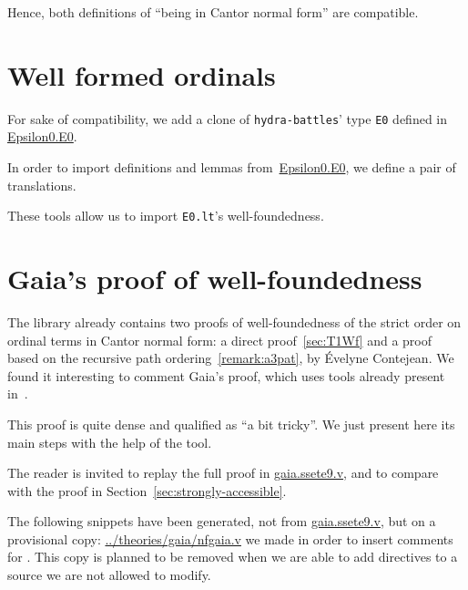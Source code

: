 

Hence, both definitions of ``being in Cantor normal form'' are
compatible.


\section{Well formed ordinals}
For sake of compatibility, we add a clone of \texttt{hydra-battles}' type \texttt{E0} defined in \href{../theories/html/hydras.Epsilon0.E0.html}{Epsilon0.E0}.


In order to import definitions and lemmas
from~\href{../theories/html/hydras.Epsilon0.E0.html}{Epsilon0.E0}, we define a pair of translations.


These tools allow us to import \texttt{E0.lt}'s  well-foundedness.


\section{Gaia's proof of well-foundedness}
The library \Hydras already contains two proofs
of well-foundedness of the strict order on ordinal terms in
Cantor normal form: a direct proof~\vref{sec:T1Wf} and a proof based on the recursive path ordering~\vref{remark:a3pat}, by
\'Evelyne Contejean. We found it interesting to comment Gaia's proof, which uses tools already present in~\cite{CantorContrib}.



This proof is quite dense and qualified as ``a bit tricky''. We just present here its main steps with the help of the \alectr tool.

The reader is invited to replay the full proof in  \href{https://github.com/coq-community/gaia/blob/master/theories/ssete9.v}{gaia.ssete9.v}, and to compare with
the proof in Section~\ref{sec:strongly-accessible}.

\begin{remark}
  The following snippets have been generated, not from
  \href{https://github.com/coq-community/gaia/blob/master/theories/ssete9.v}{gaia.ssete9.v}, but on a provisional copy:
\url{../theories/gaia/nfgaia.v} we made in order to insert comments for \alectr.  This copy is planned to be removed when we are able to add \alectr directives to a \coq source we are not allowed to modify.
\end{remark}

